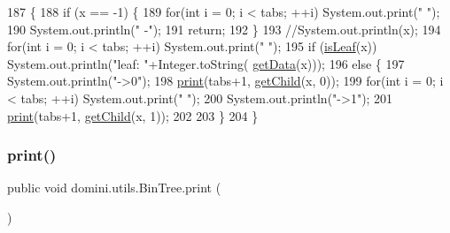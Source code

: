 \begin{DoxyCode}
187                                         \{
188         \textcolor{keywordflow}{if} (x == -1) \{
189             \textcolor{keywordflow}{for}(\textcolor{keywordtype}{int} i = 0; i < tabs; ++i) System.out.print(\textcolor{stringliteral}{"  "});
190             System.out.println(\textcolor{stringliteral}{" -"});
191             \textcolor{keywordflow}{return};
192         \}
193         \textcolor{comment}{//System.out.println(x);}
194         \textcolor{keywordflow}{for}(\textcolor{keywordtype}{int} i = 0; i < tabs; ++i) System.out.print(\textcolor{stringliteral}{"  "});
195         \textcolor{keywordflow}{if} (\hyperlink{classdomini_1_1utils_1_1BinTree_a37030e961f5613a5c74984ac002d965b}{isLeaf}(x)) System.out.println(\textcolor{stringliteral}{"leaf: "}+Integer.toString(
      \hyperlink{classdomini_1_1utils_1_1BinTree_ad8734786aa8ba40815e4b782264aef64}{getData}(x)));
196         \textcolor{keywordflow}{else} \{
197             System.out.println(\textcolor{stringliteral}{"->0"});
198             \hyperlink{classdomini_1_1utils_1_1BinTree_a0dc4daeb2d0e221cc8fc702d1d0ec795}{print}(tabs+1, \hyperlink{classdomini_1_1utils_1_1BinTree_aee1ed36b9433869f94a6ee8a6815d872}{getChild}(x, 0));
199             \textcolor{keywordflow}{for}(\textcolor{keywordtype}{int} i = 0; i < tabs; ++i) System.out.print(\textcolor{stringliteral}{"  "});
200             System.out.println(\textcolor{stringliteral}{"->1"});
201             \hyperlink{classdomini_1_1utils_1_1BinTree_a0dc4daeb2d0e221cc8fc702d1d0ec795}{print}(tabs+1, \hyperlink{classdomini_1_1utils_1_1BinTree_aee1ed36b9433869f94a6ee8a6815d872}{getChild}(x, 1));
202 
203         \}
204     \}
\end{DoxyCode}
\mbox{\label{classdomini_1_1utils_1_1BinTree_a0dc4daeb2d0e221cc8fc702d1d0ec795}} 
\subsubsection{\texorpdfstring{print()}{print()}\hspace{0.1cm}{\footnotesize\ttfamily [2/2]}}
{\footnotesize\ttfamily public void domini.\+utils.\+Bin\+Tree.\+print (\begin{DoxyParamCaption}{ }\end{DoxyParamCaption})\hspace{0.3cm}{\ttfamily [inline]}}



